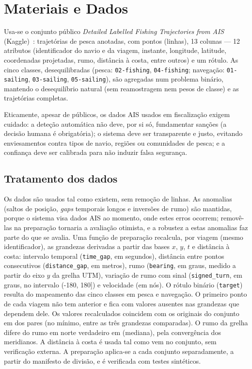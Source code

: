 \documentclass{article}
\newcommand{\revtext}[2]{{\color{#1}#2}}
\newcommand{\rv}[1]{#1}
\begin{document}
\section{Materiais e Dados}
\label{sec:materiais-dados}

\revtext{rev048}{Usa-se} o conjunto público \emph{Detailed Labelled Fishing Trajectories from AIS} (Kaggle)~\cite{kaggleAIS}: \rv{\resDadosViagens} trajetórias de pesca anotadas, com \rv{\resDadosLinhas} pontos (linhas), 13 colunas --- 12 atributos (identificador do navio e da viagem, instante, longitude, latitude, coordenadas projetadas, rumo, distância à costa, entre outros) e um rótulo. As cinco classes, desequilibradas (pesca: \texttt{02-fishing}, \texttt{04-fishing}; navegação: \texttt{01-sailing}, \texttt{03-sailing}, \texttt{05-sailing}), são agregadas num problema binário, mantendo o desequilíbrio natural (sem reamostragem nem pesos de classe) e as trajetórias completas.

Eticamente, apesar de públicos, os dados AIS usados em fiscalização exigem cuidado: a deteção automática não deve, por si só, fundamentar sanções (a decisão humana é obrigatória); o sistema deve ser transparente e justo, evitando enviesamentos contra tipos de navio, regiões ou comunidades de pesca; e a confiança deve ser calibrada para não induzir falsa segurança.

\subsection{Tratamento dos dados}
\label{sec:tratamento-dados}

Os dados são usados tal como existem, sem remoção de linhas. As anomalias (saltos de posição, \emph{gaps} temporais longos e inversões de rumo) são mantidas, porque o sistema visa dados AIS ao momento, onde estes erros ocorrem; removê-las na preparação tornaria a avaliação otimista, e a robustez a estas anomalias faz parte do que se avalia. Uma função de preparação recalcula, por viagem (mesmo identificador), as grandezas derivadas a partir das bases $x$, $y$, $t$ e distância à costa: intervalo temporal (\texttt{time\_gap}, em segundos), distância entre pontos consecutivos (\texttt{distance\_gap}, em metros), rumo (\texttt{bearing}, em graus, medido a partir do eixo $y$ da grelha UTM), variação de rumo com sinal (\texttt{signed\_turn}, em graus, no intervalo (-180, 180]) e velocidade (em nós). O rótulo binário (\texttt{target}) resulta do mapeamento das cinco classes em pesca e navegação. O primeiro ponto de cada viagem não tem anterior e fica com valores ausentes nas grandezas que dependem dele. Os valores recalculados coincidem com os originais do conjunto em \rv{\resPrepCoincide} dos pares (no mínimo, entre as três grandezas comparadas). O rumo da grelha difere do rumo em norte verdadeiro em \rv{\resPrepBearingMediana}\textdegree{} (mediana), pela convergência dos meridianos. A distância à costa é usada tal como vem no conjunto, sem verificação externa. A preparação aplica-se a cada conjunto separadamente, a partir do manifesto de divisão, e é verificada com testes sintéticos.
\end{document}
